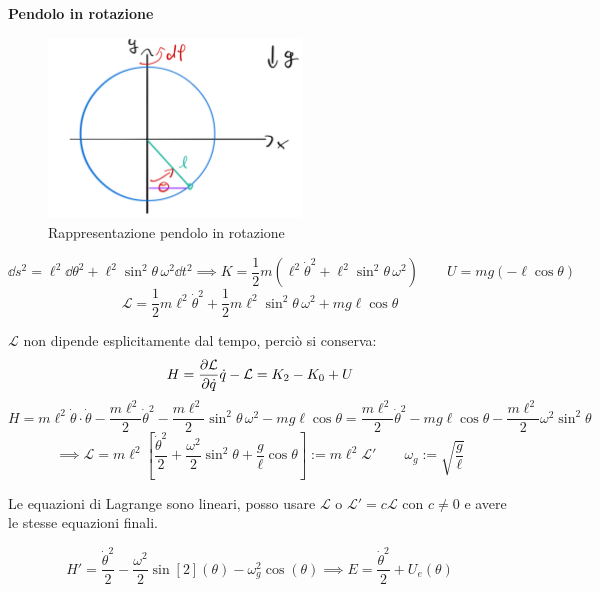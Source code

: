 \begin{example}
    \textbf{Pendolo in rotazione}

    \begin{figure}[h]
        \centering
        \includegraphics[width=0.6\textwidth]{images/pendoloInRotazione.png}
        \caption{Rappresentazione pendolo in rotazione}
    \end{figure}

    \begin{equation*}
        \dd{s}^2 = \ell^2 \dd{\theta}^2 + \ell^2 \sin^2\theta \, \omega^2 \dd{t}^2
        \implies K = \frac{1}{2}m \left( \ell^2 \dot{\theta}^2 + \ell^2 \sin^2\theta \, \omega^2 \right)
        \qquad U = mg(-\ell\cos\theta)
    \end{equation*}
    \begin{equation}
        \mathcal{L} = \frac{1}{2} m \ell^2 \dot{\theta}^2 + \frac{1}{2} m \ell^2 \sin^2\theta \, \omega^2 + mg\ell\cos\theta
    \end{equation}

    $\mathcal{L}$ non dipende esplicitamente dal tempo, perciò si conserva:
    \begin{equation}
        H = \pdv{\mathcal{L}}{\dot{q}}\dot{q}-\mathcal{L} =K_2-K_0+U
    \end{equation}
    \begin{equation*}
        H = m\ell^2 \dot{\theta} \cdot \dot{\theta} - \frac{m\ell^2}{2} \dot{\theta}^2 - \frac{m\ell^2}{2} \sin^2\theta \, \omega^2 - mg\ell \cos\theta
        = \frac{m\ell^2}{2} \dot{\theta}^2 - mg\ell \cos\theta - \frac{m\ell^2}{2} \omega^2 \sin^2\theta
    \end{equation*}
    \begin{equation}
        \implies \mathcal{L} = m\ell^2 \left[ \frac{\dot{\theta}^2}{2} + \frac{\omega^2}{2} \sin^2\theta + \frac{g}{\ell} \cos\theta \right]
        := m\ell^2 \mathcal{L}' \qquad
        \omega_g := \sqrt{\frac{g}{\ell}}
    \end{equation}
    \begin{remark}
        Le equazioni di Lagrange sono lineari, posso usare $\mathcal{L}$ o $\mathcal{L}'= c\mathcal{L}$ con $c\neq0$ e avere le stesse equazioni finali.
    \end{remark}
    \begin{equation*}
        H' = \frac{\dot{\theta}^2}{2}- \frac{\omega^2}{2}\sin[2](\theta) - \omega_g^2\cos(\theta)\implies E = \frac{\dot{\theta}^2}{2}+U_e(\theta)
    \end{equation*}
    

\end{example}
